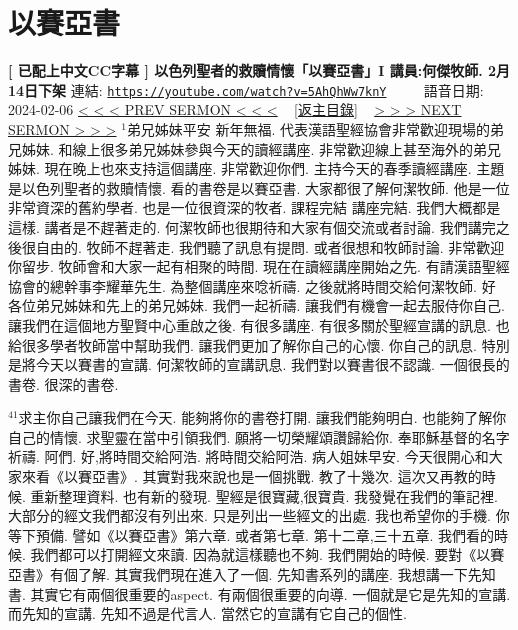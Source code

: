 \documentclass{book}
\begin{document}
\section{以賽亞書}
\label{sec:5AhQhWw7knY}
\textbf{[ 已配上中文CC字幕 ] 以色列聖者的救贖情懷「以賽亞書」I 講員:何傑牧師. 2月14日下架}
\newline
\newline
連結: \href{https://youtube.com/watch?v=5AhQhWw7knY}{\texttt{https://youtube.com/watch?v=5AhQhWw7knY}} ~~~~ 語音日期: 2024-02-06
\newline
\newline
\hyperref[sec:FsXNMWFwxHg]{\small{< < < PREV SERMON < < <}}
~
\hyperref[sec:index]{\small{[返主目錄]}}
~
\hyperref[sec:KwXlOVraPWE]{\small{> > > NEXT SERMON > > >}}
\newline
\newline
$^{1}$弟兄姊妹平安 新年無福.
代表漢語聖經協會非常歡迎現場的弟兄姊妹.
和線上很多弟兄姊妹參與今天的讀經講座.
非常歡迎線上甚至海外的弟兄姊妹.
現在晚上也來支持這個講座.
非常歡迎你們.
主持今天的春季讀經講座.
主題是以色列聖者的救贖情懷.
看的書卷是以賽亞書.
大家都很了解何潔牧師.
他是一位非常資深的舊約學者.
也是一位很資深的牧者.
課程完結 講座完結.
我們大概都是這樣.
講者是不趕著走的.
何潔牧師也很期待和大家有個交流或者討論.
我們講完之後很自由的.
牧師不趕著走.
我們聽了訊息有提問.
或者很想和牧師討論.
非常歡迎你留步.
牧師會和大家一起有相聚的時間.
現在在讀經講座開始之先.
有請漢語聖經協會的總幹事李耀華先生.
為整個講座來唸祈禱.
之後就將時間交給何潔牧師.
好 各位弟兄姊妹和先上的弟兄姊妹.
我們一起祈禱.
讓我們有機會一起去服侍你自己.
讓我們在這個地方聖賢中心重啟之後.
有很多講座.
有很多關於聖經宣講的訊息.
也給很多學者牧師當中幫助我們.
讓我們更加了解你自己的心懷.
你自己的訊息.
特別是將今天以賽書的宣講.
何潔牧師的宣講訊息.
我們對以賽書很不認識.
一個很長的書卷.
很深的書卷.

$^{41}$求主你自己讓我們在今天.
能夠將你的書卷打開.
讓我們能夠明白.
也能夠了解你自己的情懷.
求聖靈在當中引領我們.
願將一切榮耀頌讚歸給你.
奉耶穌基督的名字祈禱.
阿們.
好,將時間交給阿浩.
將時間交給阿浩.
病人姐妹早安.
今天很開心和大家來看《以賽亞書》.
其實對我來說也是一個挑戰.
教了十幾次.
這次又再教的時候.
重新整理資料.
也有新的發現.
聖經是很寶藏,很寶貴.
我發覺在我們的筆記裡.
大部分的經文我們都沒有列出來.
只是列出一些經文的出處.
我也希望你的手機.
你等下預備.
譬如《以賽亞書》第六章.
或者第七章.
第十二章,三十五章.
我們看的時候.
我們都可以打開經文來讀.
因為就這樣聽也不夠.
我們開始的時候.
要對《以賽亞書》有個了解.
其實我們現在進入了一個.
先知書系列的講座.
我想講一下先知書.
其實它有兩個很重要的aspect.
有兩個很重要的向導.
一個就是它是先知的宣講.
而先知的宣講.
先知不過是代言人.
當然它的宣講有它自己的個性.
\end{document}
